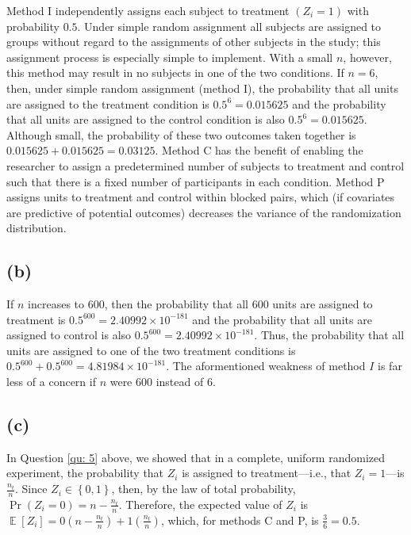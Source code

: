 \documentclass[11pt]{article}\usepackage[]{graphicx}\usepackage[]{color}
\theoremstyle{newstyle}
\DeclareMathOperator{\E}{\mathbb{E}}
\begin{document}
Method I independently assigns each subject to treatment $(Z_i=1)$ with probability $0.5$. Under simple random assignment all subjects are assigned to groups without regard to the assignments of other subjects in the study; this assignment process is especially simple to implement. With a small $n$, however, this method may result in no subjects in one of the two conditions. If $n = 6$, then, under simple random assignment (method I), the probability that all units are assigned to the treatment condition is $0.5^6 = 0.015625$ and the probability that all units are assigned to the control condition is also $0.5^6 = 0.015625$. Although small, the probability of these two outcomes taken together is $0.015625 + 0.015625 = 0.03125$. Method C has the benefit of enabling the researcher to assign a predetermined number of subjects to treatment and control such that there is a fixed number of participants in each condition. Method P assigns units to treatment and control within blocked pairs, which (if covariates are predictive of potential outcomes) decreases the variance of the randomization distribution.

\subsection{(b)}

If $n$ increases to $600$, then the probability that all $600$ units are assigned to treatment is $0.5^{600} = 2.40992 \times 10^{-181}$ and the probability that all units are assigned to control is also $0.5^{600} = 2.40992 \times 10^{-181}$. Thus, the probability that all units are assigned to one of the two treatment conditions is $0.5^{600} + 0.5^{600} = 4.81984 \times 10^{-181}$. The aformentioned weakness of method $I$ is far less of a concern if $n$ were $600$ instead of $6$.

\subsection{(c)}

In Question \ref{qu: 5} above, we showed that in a complete, uniform randomized experiment, the probability that $Z_i$ is assigned to treatment---i.e., that $Z_i = 1$---is $\frac{n_t}{n}$. Since $Z_i \in \left\{0, 1\right\}$, then, by the law of total probability, $\Pr\left(Z_i = 0\right) = n - \frac{n_t}{n}$. Therefore, the expected value of $Z_i$ is $\E\left[Z_i\right] = 0\left(n - \frac{n_t}{n}\right) + 1 \left(\frac{n_t}{n}\right)$, which, for methods C and P, is $\frac{3}{6} = 0.5$.
\end{document}
